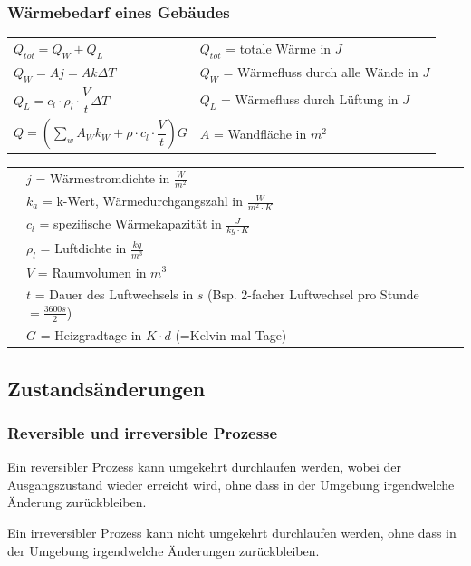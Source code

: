 			\begin{minipage}[t]{13cm}
				\subsubsection{Wärmebedarf eines Gebäudes}
					\renewcommand{\arraystretch}{2.5}
					\begin{tabular}{ p{5cm} | p{13cm}}
						$Q_{tot} = Q_W + Q_L$	&	$Q_{tot}$ = totale Wärme in $J$\\
						$Q_W = Aj = Ak \Delta T$	&	$Q_W$ = Wärmefluss durch alle Wände in $J$\\
						$Q_L = c_l \cdot \rho_l \cdot \dfrac{V}{t} \Delta T $	&	$Q_L$ = Wärmefluss durch Lüftung in $J$\\
						$Q = (\sum\limits_{w} A_W k_W + \rho \cdot c_l \cdot \dfrac{V}{t}) G$ & $A$ = Wandfläche in $m^2$\\
					\end{tabular}
					\renewcommand{\arraystretch}{1.5}
					\begin{tabular}{ p{5cm} | p{13cm} }
						& $j$ = Wärmestromdichte in $\frac{W}{m^2}$\\
						& $k_a$ = k-Wert, Wärmedurchgangszahl in $\frac{W}{m^2 \cdot K}$\\
						& $c_l$ = spezifische Wärmekapazität in $\frac{J}{kg \cdot K}$\\
						& $\rho_l$ = Luftdichte in $\frac{kg}{m^3}$\\
						& $V$ = Raumvolumen in $m^3$\\
						& $t$ = Dauer des Luftwechsels in $s$ (Bsp. 2-facher Luftwechsel pro Stunde $= \frac{3600s}{2}$)\\
						& $G$ = Heizgradtage in $K \cdot d$ (=Kelvin mal Tage)\\
					\end{tabular} 
					\renewcommand{\arraystretch}{1}
			\end{minipage}
		
	\newpage
	\subsection{Zustandsänderungen}
		\subsubsection{Reversible und irreversible Prozesse}
			\begin{minipage}[t]{13cm}
					\newline
					Ein reversibler Prozess kann umgekehrt durchlaufen werden, wobei der Ausgangszustand wieder erreicht wird, ohne dass in der Umgebung irgendwelche Änderung zurückbleiben.
			\end{minipage}
			\newline
			\newline
			\begin{minipage}[t]{13cm}
					\newline
					Ein irreversibler Prozess kann nicht umgekehrt durchlaufen werden, ohne dass in der Umgebung irgendwelche Änderungen zurückbleiben.
			\end{minipage}
	
